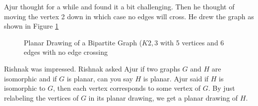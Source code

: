 Ajur thought for a while and found it a bit challenging. Then he thought of moving the vertex 2 down in which case no edges will cross. He drew the graph as shown in Figure \ref{9g4}
\begin{figure}
\begin{center}
\caption{ Planar Drawing of a Bipartite Graph ($K{2,3}$ with 5 vertices and 6 edges with  no edge crossing}\label{9g4}
\end{center}
\end{figure}

Rishnak was impressed. Rishnak asked Ajur if two graphs $G$ and $H$ are isomorphic and if $G$ is planar, can you say $H$ is planar. Ajur said if $H$ is isomorphic to $G$, then each vertex corresponds to some vertex of $G$. By just relabeling the vertices of $G$ in its planar drawing, we get a planar drawing of $H$.
